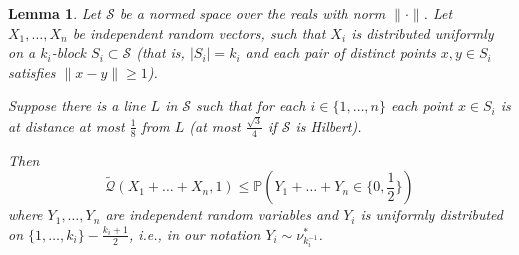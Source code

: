 \documentclass{article}
\newtheorem{lemma} [theorem] {Lemma}\newtheorem{attempt} [theorem] {Attempt}\newtheorem{corollary} [theorem] {Corollary}\newtheorem{prop} [theorem] {Proposition}\newtheorem{definition} [theorem] {Definition}\newtheorem{remark} [theorem] {Remark}\newtheorem{conjecture} [theorem] {Conjecture}\newtheorem{claim} [theorem] {Claim}
\newcommand{\pr}{\mathbb P}
\newcommand{\concdiam}{\tilde{\mathcal{Q}}}
\newcommand\nuopt[1]{\nu_{#1}^*}
\begin{document}
\begin{lemma}\label{lem.jones_strip}
    Let $\mathcal{S}$ be a normed space over the reals with norm  $\|\cdot\|$.
Let $X_1, \dots, X_n$ be independent random vectors,
    such that $X_i$ is distributed uniformly on a $k_i$-block $S_i \subset \mathcal{S}$ (that is, $|S_i| = k_i$ and each pair of distinct points $x,y \in S_i$ satisfies $\|x - y \| \ge 1$).

    Suppose there is a line $L$ in $\mathcal{S}$ such that for each $i \in \{1,\dots,n\}$ each
    point $x \in S_i$ is at distance at most $\frac 1 8$ from $L$ (at most $\frac{\sqrt 3} 4$ if $\mathcal{S}$ is Hilbert).

    Then
    \[
        \concdiam(X_1 + \dots + X_n, 1) \le \pr(Y_1 + \dots + Y_n \in \{0, \frac 1 2\})
    \]
    where $Y_1, \dots, Y_n$ are independent random variables and $Y_i$ is uniformly distributed on $\{1, \dots, k_i\} - \frac{k_i+1} 2$, i.e., in our notation $Y_i \sim \nuopt {k_i^{-1}}$.
\end{lemma}
\end{document}
